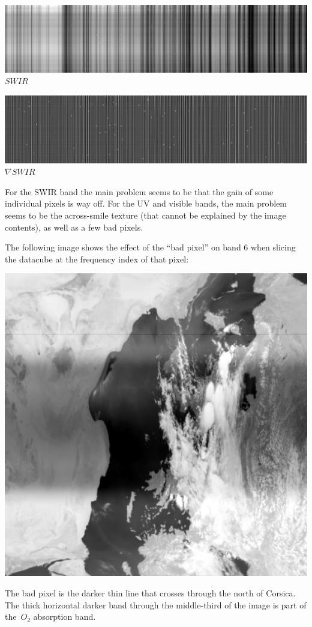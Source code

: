 \documentclass[a4paper]{article}    %
\theoremstyle{note}
\theoremstyle{plain}
\begin{document}
\includegraphics[width=\linewidth]{f/b78_avgs.png}%
$SWIR$

\includegraphics[width=\linewidth]{f/b78_lapavgs.png}%
$\nabla SWIR$

For the SWIR band the main problem seems to be that the gain of some individual
pixels is way off.  For the UV and visible bands, the main problem seems to
be the across-smile texture (that cannot be explained by the image contents),
as well as a few bad pixels.

The following image shows the effect of the ``bad pixel'' on band 6 when
slicing the datacube at the frequency index of that pixel:

\includegraphics[width=0.8\linewidth]{f/r6_288_log.png}

The bad pixel is the darker thin line that crosses through the north of
Corsica.  The thick horizontal darker band through the middle-third of the
image is part of the~$O_2$ absorption band.
\end{document}
